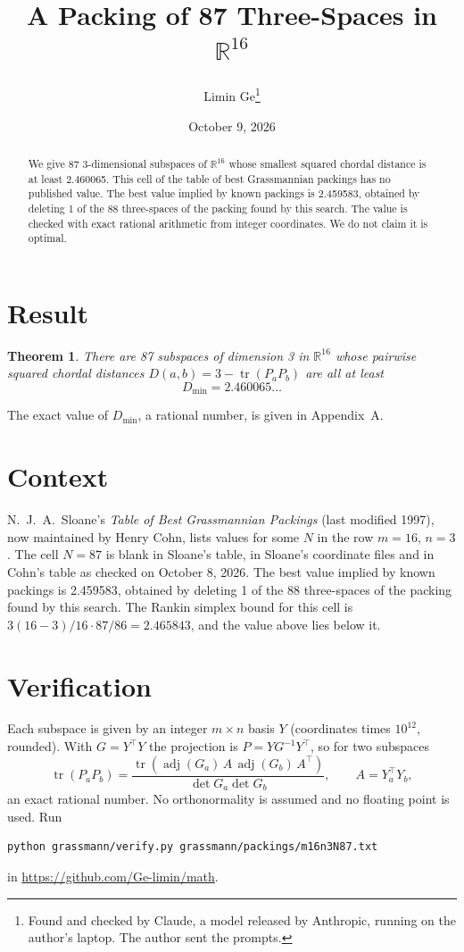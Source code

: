 \documentclass[11pt,a4paper]{article}
\title{A Packing of 87 Three-Spaces in $\mathbb{R}^{16}$}
\author{Limin Ge\thanks{Found and checked by Claude, a model released by Anthropic, running on the author's laptop. The author sent the prompts.}}
\date{October 9, 2026}
\newtheorem*{theorem}{Theorem}
\begin{document}
\maketitle
\begin{abstract}
We give 87 3-dimensional subspaces of $\mathbb{R}^{16}$ whose smallest squared chordal distance is at least 2.460065. This cell of the table of best Grassmannian packings has no published value. The best value implied by known packings is 2.459583, obtained by deleting 1 of the 88 three-spaces of the packing found by this search. The value is checked with exact rational arithmetic from integer coordinates. We do not claim it is optimal.
\end{abstract}

\section{Result}
\begin{theorem}
There are 87 subspaces of dimension 3 in $\mathbb{R}^{16}$ whose pairwise squared chordal distances $D(a,b) = 3 - \operatorname{tr}(P_aP_b)$ are all at least
\[ D_{\min} = 2.460065\ldots \]
\end{theorem}
The exact value of $D_{\min}$, a rational number, is given in Appendix~A.


\section{Context}
N.~J.~A.~Sloane's \emph{Table of Best Grassmannian Packings} (last modified 1997), now maintained by Henry Cohn, lists values for some $N$ in the row $m=16$, $n=3$. The cell $N=87$ is blank in Sloane's table, in Sloane's coordinate files and in Cohn's table as checked on October 8, 2026. The best value implied by known packings is 2.459583, obtained by deleting 1 of the 88 three-spaces of the packing found by this search. The Rankin simplex bound for this cell is $3(16-3)/16\cdot 87/86 = 2.465843$, and the value above lies below it.


\section{Verification}
Each subspace is given by an integer $m\times n$ basis $Y$ (coordinates times $10^{12}$, rounded). With $G=Y^\top Y$ the projection is $P=YG^{-1}Y^\top$, so for two subspaces
\[ \operatorname{tr}(P_aP_b)=\frac{\operatorname{tr}(\operatorname{adj}(G_a)\,A\,\operatorname{adj}(G_b)\,A^\top)}{\det G_a\det G_b},\qquad A=Y_a^\top Y_b, \]
an exact rational number. No orthonormality is assumed and no floating point is used. Run
\begin{verbatim}
python grassmann/verify.py grassmann/packings/m16n3N87.txt
\end{verbatim}
in \url{https://github.com/Ge-limin/math}.
\end{document}
